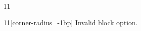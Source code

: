 \documentclass[paper=A4]{ropas-poster}
\begin{document}
\begin{postergrid}{1}{1}
\begin{posterblock}{1}{1}[corner-radius=-1bp]
Invalid block option.
\end{posterblock}
\end{postergrid}
\end{document}
